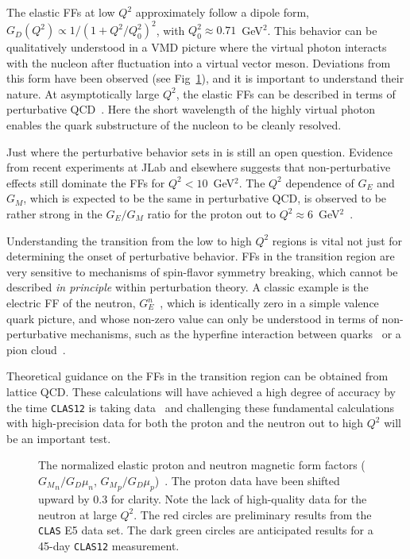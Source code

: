 The elastic FFs at low $Q^2$ approximately follow a dipole form, 
$G_D(Q^2) \propto 1/(1 + Q^2/Q_0^2)^2$, with $Q_0^2 \approx 0.71$~GeV$^2$.  
This behavior can be qualitatively understood in a VMD picture where the 
virtual photon interacts with the nucleon after fluctuation into a virtual 
vector meson.  Deviations from this form have been observed (see 
Fig~\ref{fig:ff_fig1}), and it is important to understand their nature.
At asymptotically large $Q^2$, the elastic FFs can be described 
in terms of perturbative QCD~\cite{LB}.  Here the short wavelength of the 
highly virtual photon enables the quark substructure of the nucleon to be 
cleanly resolved.

Just where the perturbative behavior sets in is still an open question.
Evidence from recent experiments at JLab and elsewhere suggests that 
non-perturbative effects still dominate the FFs for $Q^2 < 10$~GeV$^2$.
The $Q^2$ dependence of $G_E$ and $G_M$, which is expected to be the same 
in perturbative QCD, is observed to be rather strong in the $G_E/G_M$ 
ratio for the proton out to $Q^2 \approx 6$~GeV$^2$~\cite{GEMJL1,GEMJL2}.

Understanding the transition from the low to high $Q^2$ regions is vital
not just for determining the onset of perturbative behavior.  FFs 
in the transition region are very sensitive to mechanisms of spin-flavor 
symmetry breaking, which cannot be described {\em in principle} within 
perturbation theory.  A classic example is the electric FF of the 
neutron, $G_E^n$~\cite{GEN}, which is identically zero in a simple valence 
quark picture, and whose non-zero value can only be understood in terms of
non-perturbative mechanisms, such as the hyperfine interaction between
quarks~\cite{IKS} or a pion cloud~\cite{THOMAS}.

Theoretical guidance on the FFs in the transition region can
be obtained from lattice QCD.  These calculations will have achieved a 
high degree of accuracy by the time {\tt CLAS12} is taking data~\cite{LQCD}
and challenging these fundamental calculations with high-precision data 
for both the proton and the neutron out to high $Q^2$ will be an important 
test.

\begin{figure}[htbp]
\vspace{5.7cm}
\caption{\small{The normalized elastic proton and neutron magnetic form
factors (${G_M}_n/G_{D}\mu_n$, ${G_M}_p/G_{D}\mu_p$)~\cite{BOSTED95,chw1}. 
The proton data have been shifted upward by 0.3 for clarity.  Note the lack 
of high-quality data for the neutron at large $Q^2$.  The red circles are 
preliminary results from the {\tt CLAS} E5 data set.  The dark green circles 
are anticipated results for a 45-day {\tt CLAS12} measurement.}}
\label{fig:ff_fig1}
\end{figure}

